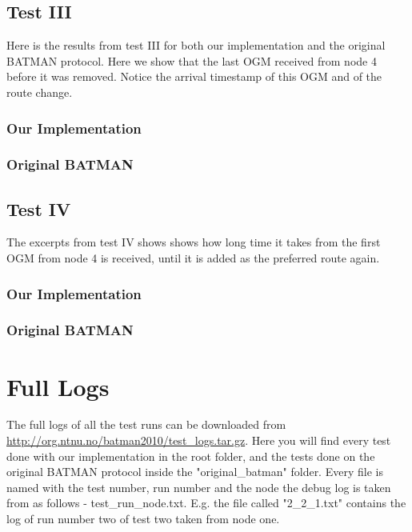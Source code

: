 \subsection{Test III}
Here is the results from test III for both our implementation and the original BATMAN protocol. Here we show that the last OGM received from node 4 before it was removed. Notice the arrival timestamp of this OGM and of the route change.

\subsubsection*{Our Implementation}


\subsubsection*{Original BATMAN}


\subsection{Test IV}
The excerpts from test IV shows shows how long time it takes from the first OGM from node 4 is received, until it is added as the preferred route again.

\subsubsection*{Our Implementation}


\subsubsection*{Original BATMAN}


\section{Full Logs}
The full logs of all the test runs can be downloaded from \url{http://org.ntnu.no/batman2010/test\_logs.tar.gz}. Here you will find every test done with our implementation in the root folder, and the tests done on the original BATMAN protocol inside the "original\_batman" folder. Every file is named with the test number, run number and the node the debug log is taken from as follows - test\_run\_node.txt. E.g. the file called "2\_2\_1.txt" contains the log of run number two of test two taken from node one.


